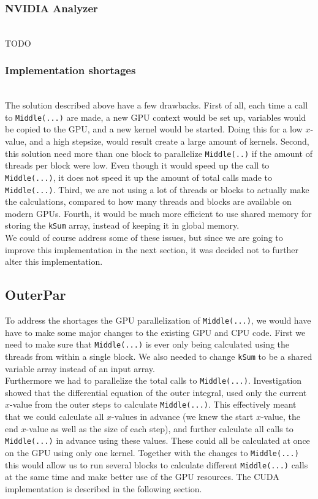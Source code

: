 \subsubsection{NVIDIA Analyzer} \hfill \\
TODO

\subsubsection{Implementation shortages} \hfill \\
\label{label:shortages}
The solution described above have a few drawbacks. First of all, each time a call to \texttt{Middle(...)} are made, a new GPU context would be set up, variables would be copied to the GPU, and a new kernel would be started. Doing this for a low $x$-value, and a high stepsize, would result create a large amount of kernels. Second, this solution need more than one block to parallelize \texttt{Middle(..)} if the amount of threads per block were low. Even though it would speed up the call to \texttt{Middle(...)}, it does not speed it up the amount of total calls made to \texttt{Middle(...)}. Third, we are not using a lot of threads or blocks to actually make the calculations, compared to how many threads and blocks are available on modern GPUs. Fourth, it would be much more efficient to use shared memory for storing the \texttt{kSum} array, instead of keeping it in global memory.\\

We could of course address some of these issues, but since we are going to improve this implementation in the next section, it was decided not to further alter this implementation. \\

\subsection{OuterPar}
To address the shortages the GPU parallelization of \texttt{Middle(...)}, we would have have to make some major changes to the existing GPU and CPU code. First we need to make sure that \texttt{Middle(...)} is ever only being calculated using the threads from within a single block. We also needed to change \texttt{kSum} to be a shared variable array instead of an input array. \\

Furthermore we had to parallelize the total calls to \texttt{Middle(...)}. Investigation showed that the differential equation of the outer integral, used only the current $x$-value from the outer steps to calculate \texttt{Middle(...)}. This effectively meant that we could calculate all $x$-values in advance (we knew the start $x$-value, the end $x$-value as well as the size of each step), and further calculate all calls to \texttt{Middle(...)} in advance using these values. These could all be calculated at once on the GPU using only one kernel. Together with the changes to \texttt{Middle(...)} this would allow us to run several blocks to calculate different \texttt{Middle(...)} calls at the same time and make better use of the GPU resources. The CUDA implementation is described in the following section.

